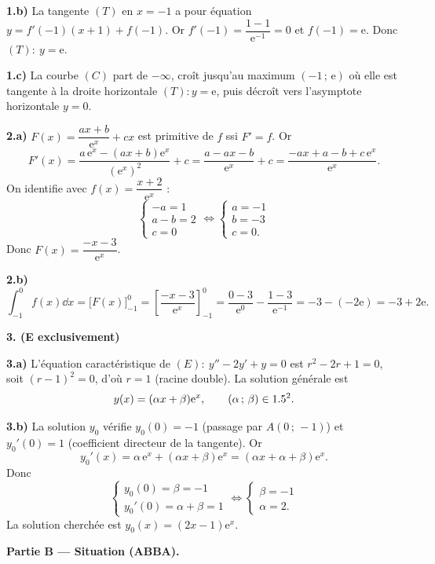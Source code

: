 \noindent\textbf{1.b)} La tangente $(T)$ en $x=-1$ a pour équation $y=f'(-1)(x+1)+f(-1)$. Or $f'(-1)=\dfrac{1-1}{\mathrm e^{-1}}=0$ et $f(-1)=\mathrm e$. Donc $(T):\ y=\mathrm e$.

\noindent\textbf{1.c)} La courbe $(C)$ part de $-\infty$, croît jusqu'au maximum $(-1\,;\,\mathrm e)$ où elle est tangente à la droite horizontale $(T):y=\mathrm e$, puis décroît vers l'asymptote horizontale $y=0$.

\noindent\textbf{2.a)} $F(x)=\dfrac{ax+b}{\mathrm e^{x}}+cx$ est primitive de $f$ ssi $F'=f$. Or
\[
F'(x)=\frac{a\,\mathrm e^{x}-(ax+b)\mathrm e^{x}}{(\mathrm e^{x})^2}+c=\frac{a-ax-b}{\mathrm e^{x}}+c=\frac{-ax+a-b+c\,\mathrm e^{x}}{\mathrm e^{x}}.
\]
On identifie avec $f(x)=\dfrac{x+2}{\mathrm e^{x}}$ :
\[
\begin{cases}-a=1\\a-b=2\\c=0\end{cases}\iff\begin{cases}a=-1\\b=-3\\c=0.\end{cases}
\]
Donc $F(x)=\dfrac{-x-3}{\mathrm e^{x}}$.

\noindent\textbf{2.b)}
\[
\int_{-1}^{0}f(x)\dd x=\Big[F(x)\Big]_{-1}^{0}=\left[\frac{-x-3}{\mathrm e^{x}}\right]_{-1}^{0}
=\frac{0-3}{\mathrm e^{0}}-\frac{1-3}{\mathrm e^{-1}}=-3-(-2\mathrm e)=-3+2\mathrm e.
\]

\noindent\textbf{3. (E exclusivement)}

\noindent\textbf{3.a)} L'équation caractéristique de $(E):\ y''-2y'+y=0$ est $r^2-2r+1=0$, soit $(r-1)^2=0$, d'où $r=1$ (racine double). La solution générale est
\[
y(x)=(\alpha x+\beta)\mathrm e^{x},\qquad (\alpha\,;\,\beta)\in1.5^2.
\]

\noindent\textbf{3.b)} La solution $y_0$ vérifie $y_0(0)=-1$ (passage par $A(0\,;\,-1)$) et $y_0'(0)=1$ (coefficient directeur de la tangente). Or
\[
y_0'(x)=\alpha\,\mathrm e^{x}+(\alpha x+\beta)\mathrm e^{x}=(\alpha x+\alpha+\beta)\mathrm e^{x}.
\]
Donc
\[
\begin{cases}y_0(0)=\beta=-1\\y_0'(0)=\alpha+\beta=1\end{cases}\iff\begin{cases}\beta=-1\\\alpha=2.\end{cases}
\]
La solution cherchée est $y_0(x)=(2x-1)\mathrm e^{x}$.

\bigskip
\noindent\textbf{Partie B — Situation (ABBA).}

